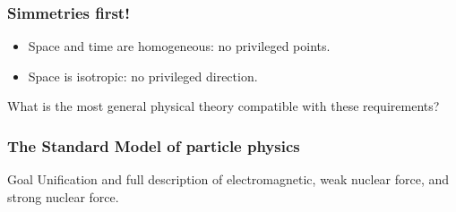 \documentclass[ukenglish]{beamer}
\begin{document}
\begin{frame}
    \frametitle{Simmetries first!}
    \begin{itemize}
        \item Space and time are homogeneous: no privileged points.
        \item Space is isotropic: no privileged direction.
    \end{itemize}

    What is the most general physical theory compatible with these requirements?


\end{frame}

\begin{frame}
    \frametitle{The Standard Model of particle physics}
    \begin{block}
        {Goal}
    Unification and full description of electromagnetic, weak nuclear force, and strong nuclear
    force.
    \end{block}
    \begin{enumerate}
         {\item symmetry principle. [$SU(3) \times SU(2) \times
            U(1)$ invariance];
    \end{enumerate}

\end{frame}
\end{document}
